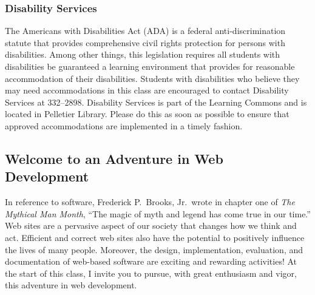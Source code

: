 \documentclass[11pt]{article}
\begin{document}
\subsubsection*{Disability Services}

The Americans with Disabilities Act (ADA) is a federal anti-discrimination
statute that provides comprehensive civil rights protection for persons with
disabilities. Among other things, this legislation requires all students with
disabilities be guaranteed a learning environment that provides for reasonable
accommodation of their disabilities. Students with disabilities who believe they
may need accommodations in this class are encouraged to contact Disability
Services at 332--2898. Disability Services is part of the Learning Commons and
is located in Pelletier Library. Please do this as soon as possible to ensure
that approved accommodations are implemented in a timely fashion.

\subsection*{Welcome to an Adventure in Web Development}

In reference to software, Frederick P.\ Brooks, Jr.\ wrote in chapter one of
{\em The Mythical Man Month}, ``The magic of myth and legend has come true in
our time.'' Web sites are a pervasive aspect of our society that changes how we
think and act. Efficient and correct web sites also have the potential to
positively influence the lives of many people. Moreover, the design,
implementation, evaluation, and documentation of web-based software are exciting
and rewarding activities! At the start of this class, I invite you to pursue,
with great enthusiasm and vigor, this adventure in web development.
\end{document}
